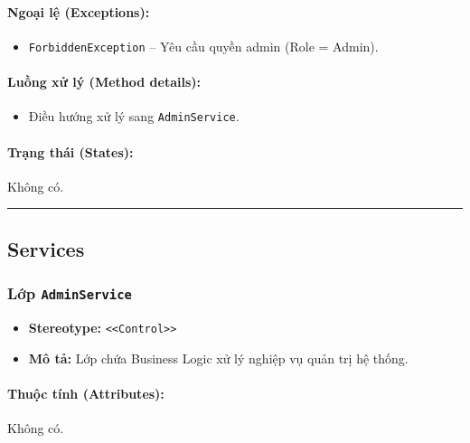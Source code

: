 \documentclass[12pt,a4paper]{article}
\begin{document}
\paragraph{Ngoại lệ (Exceptions):}
\begin{itemize}[leftmargin=*]
    \item \texttt{ForbiddenException} – Yêu cầu quyền admin (Role = Admin).
\end{itemize}


\paragraph{Luồng xử lý (Method details):}
\begin{itemize}[leftmargin=*]
    \item Điều hướng xử lý sang \texttt{AdminService}.
\end{itemize}


\paragraph{Trạng thái (States):}
Không có.

\vskip 0.5cm
\noindent\rule{\textwidth}{0.5pt}
\vskip 0.5cm

\subsection{Services}


\subsubsection{Lớp \texttt{AdminService}}

\begin{itemize}[leftmargin=*]
    \item \textbf{Stereotype:} \texttt{\textless{}\textless{}Control\textgreater{}\textgreater{}}
    \item \textbf{Mô tả:} Lớp chứa Business Logic xử lý nghiệp vụ quản trị hệ thống.
\end{itemize}

\paragraph{Thuộc tính (Attributes):}
Không có.
\end{document}
